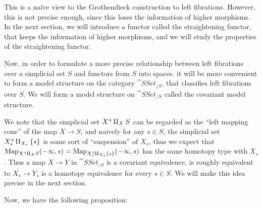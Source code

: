 
This is a na\"ive view to the Grothendieck construction to left fibrations. However, this is not precise enough, since
this loses the information of higher morphisms. In the next section, we will introduce a functor called the straightening functor,
that keeps the information of higher morphisms, and we will study the properties of the straightening functor.

Now, in order to formulate a more precise relationship between left fibrations over a simplicial set $S$ and functors
from $S$ into spaces. it will be more convenient to form a model structure on the category $\cat{SSet}_{/S}$,
that classifies left fibrations over $S$. We will form a model structure on $\cat{SSet}_{/S}$ called the covariant model structure.


We note that the simplicial set $X^\triangleleft\amalg_{X}S$ can be regarded as the ``left mapping cone'' of the map $X\to S$, and naively
for any $s\in S$, the simplicial set $X_s^\triangleleft\amalg_{X_s}\{s\}$ is some sort of ``suspension'' of $X_s$,
thus we expect that $\operatorname{Map}_{X^\triangleleft\amalg_{X}S}(-\infty,s)=\operatorname{Map}_{X_s^\triangleleft\amalg_{X_s}\{s\}}(-\infty,s)$
has the same homotopy type with $X_s$. Thus a map $X\to Y$ in $\cat{SSet}_{/S}$ is a covariant equivalence, is roughly equivalent to
$X_s\to Y_s$ is a homotopy equivalence for every $s\in S$. We will make this idea precise in the next section.

Now, we have the following proposition:


